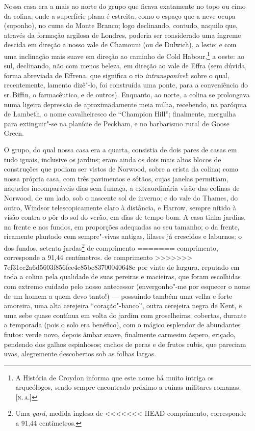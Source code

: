 {{{{{{{{{{{{%
Nossa casa era a mais ao norte do grupo que ficava exatamente no
topo ou cimo da colina, onde a superfície plana é estreita, como o
espaço que a neve ocupa (suponho), no cume do Monte Branco; logo
declinando, contudo, naquilo que, através da formação argilosa de
Londres, poderia ser considerado uma íngreme descida em direção a nosso
vale de Chamouni (ou de Dulwich), a leste; e com uma inclinação mais
suave em direção ao caminho de Cold Habour,\footnote{A História de
  Croydon informa que este nome há muito intriga os arqueólogos, sendo
  sempre encontrado próximo a ruínas militares romanas. {[}\textsc{n.\,a.}{]}}
a oeste: ao sul, declinando, não com menos beleza, em direção ao vale de
Effra (sem dúvida, forma abreviada de Effrena, que significa o rio
\textit{intransponível}; sobre o qual, recentemente, lamento dizê"-lo, foi
construída uma ponte, para a conveniência do sr.\,Biffin, o farmacêutico,
e de outros). Enquanto, ao norte, a colina se prolongava numa ligeira
depressão de aproximadamente meia milha, recebendo, na paróquia de
Lambeth, o nome cavalheiresco de ``Champion Hill''; finalmente, mergulha
para extinguir"-se na planície de Peckham, e no barbarismo rural de Goose
Green.

O grupo, do qual nossa casa era a quarta, consistia de dois pares de
casas em tudo iguais, inclusive os jardins; eram ainda os dois mais
altos blocos de construções que podiam ser vistos de Norwood, sobre a
crista da colina; como nossa própria casa, com três pavimentos e sótãos,
cujas janelas permitiam, naqueles incomparáveis dias sem fumaça, a
extraordinária visão das colinas de Norwood, de um lado, sob o nascente
sol de inverno; e do vale do Thames, do outro, Windsor telescopicamente
claro à distância, e Harrow, sempre nítido à visão contra o pôr do sol
do verão, em dias de tempo bom. A casa tinha jardins, na frente e nos
fundos, em proporções adequadas ao seu tamanho; o da frente, ricamente
plantado com sempre"-vivas antigas, lilases já crescidos e laburnos; o
dos fundos, setenta jardas\footnote{Uma \textit{yard}, medida inglesa de
<<<<<<< HEAD
  comprimento, corresponde a 91,44 centímetros.} de comprimento
=======
  comprimento, corresponde a 91,44 centímetros.  de comprimento
>>>>>>> 7ef31cc2a6d5603f856fee4c85bc83700040648c
por vinte de largura, reputado em toda a colina pela qualidade de suas
pereiras e macieiras, que foram escolhidas com extremo cuidado pelo
nosso antecessor (envergonho"-me por esquecer o nome de um homem a quem
devo tanto!) --- possuindo também uma velha e forte amoreira, uma alta
cerejeira ``coração"-banco'', outra cerejeira negra de Kent, e uma sebe
quase contínua em volta do jardim com groselheiras; cobertas, durante a
temporada (pois o solo era benéfico), com o mágico esplendor de
abundantes frutos: verde novo, depois âmbar suave, finalmente carmesim
áspero, eriçado, pendendo dos galhos espinhosos; cachos de peras e de
frutos rubis, que pareciam uvas, alegremente descobertos sob as folhas
largas.

}}}}}}}}}}}}
